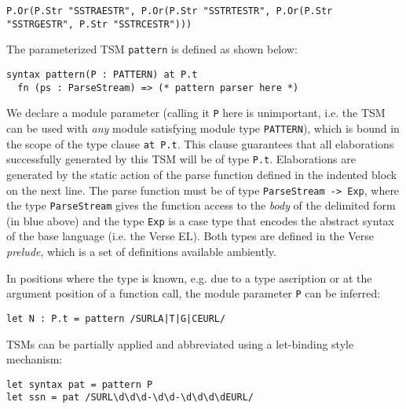 \begin{lstlisting}[numbers=none]
P.Or(P.Str "SSTRAESTR", P.Or(P.Str "SSTRTESTR", P.Or(P.Str "SSTRGESTR", P.Str "SSTRCESTR")))
\end{lstlisting}
The parameterized TSM \lstinline{pattern} is defined as shown below:
\begin{lstlisting}[numbers=none]
syntax pattern(P : PATTERN) at P.t
  fn (ps : ParseStream) => (* pattern parser here *)
\end{lstlisting}
We declare a module parameter (calling it \lstinline{P} here is unimportant, i.e. the TSM can be used with \emph{any} module satisfying module type \lstinline{PATTERN}), which is bound in the scope of the type clause \lstinline{at P.t}. This clause  guarantees that all elaborations successfully generated by this TSM will be of type \lstinline{P.t}. Elaborations are generated by the static action of the parse function defined in the indented block on the next line. The parse function must be of type \lstinline{ParseStream -> Exp}, where the type \lstinline{ParseStream} gives the function access to the \emph{body} of the delimited form (in blue above) and the type \lstinline{Exp} is a case type that encodes the abstract syntax of the base language (i.e. the Verse EL). Both types are defined in the Verse \emph{prelude}, which is a set of definitions available ambiently.

In positions where the type is known, e.g. due to a type ascription or at the argument position of a function call, the module parameter \lstinline{P} can be inferred:
\begin{lstlisting}[numbers=none]
let N : P.t = pattern /SURLA|T|G|CEURL/
\end{lstlisting}

TSMs can be partially applied and abbreviated using a let-binding style mechanism:
\begin{lstlisting}[numbers=none]
let syntax pat = pattern P 
let ssn = pat /SURL\d\d\d-\d\d-\d\d\d\dEURL/
\end{lstlisting}

